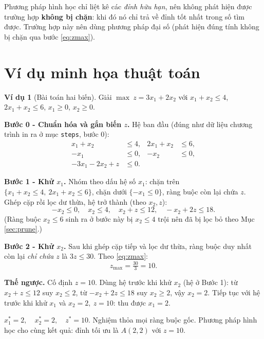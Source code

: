\documentclass[12pt,a4paper]{article}
\theoremstyle{definition}
\newtheorem{example}{Ví dụ}[section]
\begin{document}
\begin{infobox}
Phương pháp hình học chỉ liệt kê các \emph{đỉnh hữu hạn}, nên không phát hiện
được trường hợp \textbf{không bị chặn}: khi đó nó chỉ trả về đỉnh tốt nhất trong
số tìm được. Trường hợp này nên dùng phương pháp đại số (phát hiện đúng tính
không bị chặn qua bước \eqref{eq:zmax}).
\end{infobox}

\section{Ví dụ minh họa thuật toán}

\begin{example}[Bài toán hai biến]
\label{ex:tc1}
Giải $\max\ z = 3x_1 + 2x_2$ với
$x_1 + x_2 \le 4$, $2x_1 + x_2 \le 6$, $x_1 \ge 0$, $x_2 \ge 0$.
\end{example}

\textbf{Bước 0 - Chuẩn hóa và gắn biến $z$.} Hệ ban đầu (đúng như dữ liệu
chương trình in ra ở mục \texttt{steps}, bước 0):
\begin{align*}
    x_1 + x_2 &\le 4, &
    2x_1 + x_2 &\le 6, \\
    -x_1 &\le 0, &
    -x_2 &\le 0, \\
    -3x_1 - 2x_2 + z &\le 0. & &
\end{align*}

\textbf{Bước 1 - Khử $x_1$.} Nhóm theo dấu hệ số $x_1$: chặn trên
$\{x_1+x_2\le4,\ 2x_1+x_2\le6\}$, chặn dưới $\{-x_1\le0\}$, ràng buộc còn lại
chứa $z$. Ghép cặp rồi lọc dư thừa, hệ trở thành (theo $x_2, z$):
\[
    -x_2 \le 0,\quad x_2 \le 4,\quad x_2 + z \le 12,\quad -x_2 + 2z \le 18.
\]
(Ràng buộc $x_2 \le 6$ sinh ra ở bước này bị $x_2 \le 4$ trội nên đã bị lọc bỏ
theo Mục \ref{sec:prune}.)

\textbf{Bước 2 - Khử $x_2$.} Sau khi ghép cặp tiếp và lọc dư thừa, ràng buộc
duy nhất còn lại \emph{chỉ chứa $z$} là $3z \le 30$. Theo \eqref{eq:zmax}:
\[
    z_{\max} = \tfrac{30}{3} = 10.
\]

\textbf{Thế ngược.} Cố định $z = 10$. Dùng hệ trước khi khử $x_2$ (hệ
ở Bước 1): từ $x_2 + z \le 12$ suy $x_2 \le 2$, từ $-x_2 + 2z \le 18$ suy
$x_2 \ge 2$, vậy $x_2 = 2$. Tiếp tục với hệ trước khi khử $x_1$ và
$x_2 = 2,\ z = 10$: thu được $x_1 = 2$.

\begin{resultbox}
$x_1^\ast = 2,\quad x_2^\ast = 2,\quad z^\ast = 10.$
Nghiệm thỏa mọi ràng buộc gốc. Phương pháp hình học cho cùng kết quả: đỉnh tối
ưu là $A(2, 2)$ với $z = 10$.
\end{resultbox}
\end{document}

